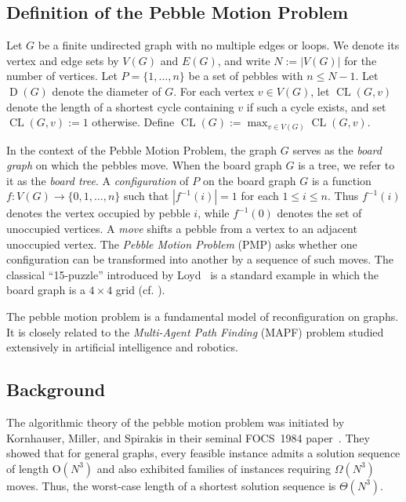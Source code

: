 \documentclass[letter,11pt]{article}
\theoremstyle{definition}
\theoremstyle{definition}
\DeclareMathOperator{\D}{D}
\DeclareMathOperator{\CL}{CL}
\newcommand{\1}{\boldmath$~1~$\unboldmath}
\newcommand{\Ord}{\mathrm{O}}
\begin{document}
\subsection{Definition of the Pebble Motion Problem}

Let $G$ be a finite undirected graph with no multiple edges or loops.
We denote its vertex and edge sets by $V(G)$ and $E(G)$, and write
$N := |V(G)|$ for the number of vertices.
Let $P=\{1,\ldots,n\}$ be a set of pebbles with $n \leq N-1$.
Let $\D(G)$ denote the diameter of $G$. 
For each vertex $v \in V(G)$, let $\CL(G,v)$ denote the length of a
shortest cycle containing $v$ if such a cycle exists, and set
$\CL(G,v) := 1$ otherwise. Define $\CL(G) := \max_{v \in V(G)} \CL(G,v)$.


In the context of the Pebble Motion Problem, the graph $G$ serves as the
\textit{board graph} on which the pebbles move.
When the board graph $G$ is a tree, we refer to it as the
\textit{board tree}.
A \textit{configuration} of $P$ on the board graph $G$ is a function 
$f : V(G) \to \{0,1,\ldots,n\}$ such that $|f^{-1}(i)| = 1$ for each
$1 \le i \le n$.
Thus $f^{-1}(i)$ denotes the vertex occupied by pebble $i$, while
$f^{-1}(0)$ denotes the set of unoccupied vertices.
A \textit{move} shifts a pebble from a vertex to an adjacent
unoccupied vertex.
The \textit{Pebble Motion Problem} (PMP) asks whether one configuration
can be transformed into another by a sequence of such moves.
The classical ``15-puzzle'' introduced by Loyd~\cite{loyd1959mathematical}
is a standard example in which the board graph is a $4\times4$ grid 
(cf. \cite{aa887662-c3e2-30b0-a475-bcd8c655206a, 
WOS:000083999100001}).

The pebble motion problem is a fundamental model of
reconfiguration on graphs.
It is closely related to the \textit{Multi-Agent Path Finding} (MAPF)
problem studied extensively in artificial intelligence and robotics.





\subsection{Background}

The algorithmic theory of the pebble motion problem was initiated by
Kornhauser, Miller, and Spirakis in their seminal
FOCS~1984 paper~\cite{715921}.
They showed that for general graphs, every feasible instance admits
a solution sequence of length $\Ord(N^3)$ and also exhibited families
of instances requiring $\Omega(N^3)$ moves.
Thus, the worst-case length of a shortest solution sequence is $\Theta(N^3)$.
\end{document}
